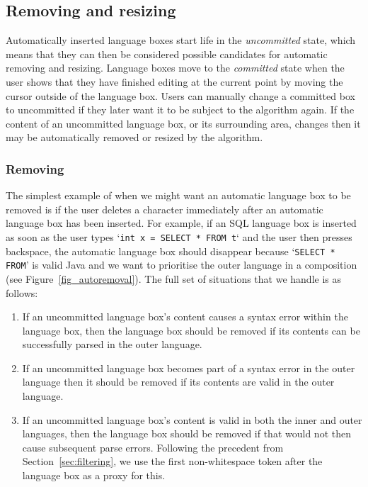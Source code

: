 \documentclass[sigplan,screen]{acmart}\settopmatter{printfolios=true,printccs=false,printacmref=false}
\begin{document}
\begin{center}
\end{center}


\subsection{Removing and resizing}

Automatically inserted language boxes start life in the \emph{uncommitted}
state, which means that they can then be considered possible candidates for
automatic removing and resizing. Language boxes move to the \emph{committed}
state when the user shows that they have finished
editing at the current point by moving the cursor outside of the language box.
Users can manually change a committed box to uncommitted if they
later want it to be subject to the algorithm again. If the content of an
uncommitted language box, or its surrounding area, changes then it may be
automatically removed or resized by the algorithm.


\subsubsection{Removing}
\label{sec:removing}

The simplest example of when we might want an automatic language box to be removed is if
the user deletes a character immediately after an automatic language box has
been inserted. For example, if an SQL language box is inserted as soon as the
user types `\texttt{int x = SELECT * FROM t}` and the user then presses
backspace, the automatic language box should disappear because `\texttt{SELECT
* FROM}' is valid Java and we want to prioritise the outer language in a
composition (see Figure~\ref{fig_autoremoval}). The full set of situations that
we handle is as follows:

\begin{enumerate}
  \item If an uncommitted language box's content causes a syntax error within
    the language box, then the language box should be removed if its contents
    can be successfully parsed in the outer language.
  \item If an uncommitted language box becomes part of a syntax error in the outer
    language then it should be removed if its contents are valid in the
    outer language.
  \item If an uncommitted language box's content is valid in both the inner and
    outer languages, then the language box should be removed if that would not
    then cause subsequent parse errors. Following the precedent from
    Section~\ref{sec:filtering}, we use the first non-whitespace token after
    the language box as a proxy for this.
\end{enumerate}
\end{document}
